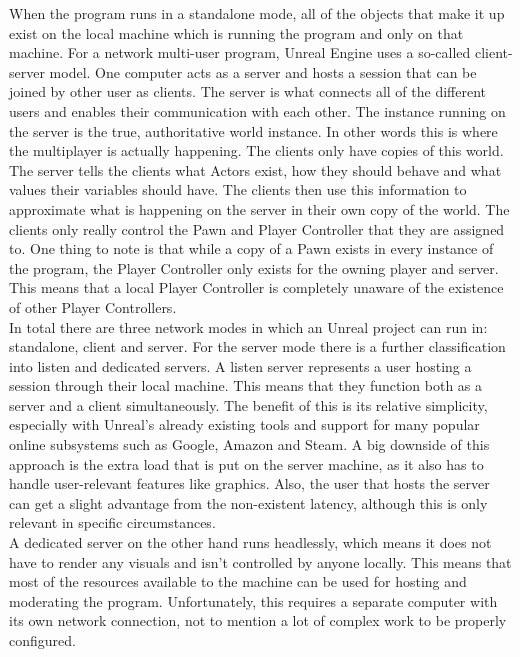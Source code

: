 When the program runs in a standalone mode, all of the objects that make it up exist on the local machine which is running the program and only on that machine. For a network multi-user program, Unreal Engine uses a so-called client-server model\cite{bib:NetworkComp}. One computer acts as a server and hosts a session that can be joined by other user as clients. The server is what connects all of the different users and enables their communication with each other. The instance running on the server is the true, authoritative world instance. In other words this is where the multiplayer is actually happening. The clients only have copies of this world. The server tells the clients what Actors exist, how they should behave and what values their variables should have. The clients then use this information to approximate what is happening on the server in their own copy of the world. The clients only really control the Pawn and Player Controller that they are assigned to. One thing to note is that while a copy of a Pawn exists in every instance of the program, the Player Controller only exists for the owning player and server. This means that a local Player Controller is completely unaware of the existence of other Player Controllers.\\

In total there are three network modes in which an Unreal project can run in: standalone, client and server\cite{bib:NetworkComp}. For the server mode there is a further classification into listen and dedicated servers. A listen server represents a user hosting a session through their local machine. This means that they function both as a server and a client simultaneously. The benefit of this is its relative simplicity, especially with Unreal's already existing tools and support for many popular online subsystems such as Google, Amazon and Steam\cite{bib:UEOnlSuS}. A big downside of this approach is the extra load that is put on the server machine, as it also has to handle user-relevant features like graphics. Also, the user that hosts the server can get a slight advantage from the non-existent latency, although this is only relevant in specific circumstances.\\
A dedicated server on the other hand runs \glqq headlessly\grqq, which means it does not have to render any visuals and isn't controlled by anyone locally. This means that most of the resources available to the machine can be used for hosting and moderating the program. Unfortunately, this requires a separate computer with its own network connection, not to mention a lot of complex work to be properly configured.\\

